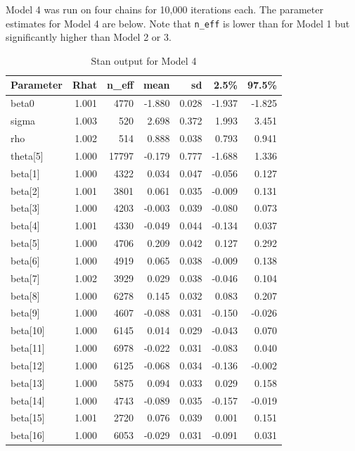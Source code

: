 \documentclass[
]{article}
\begin{document}
Model 4 was run on four chains for 10,000 iterations each. The parameter
estimates for Model 4 are below. Note that \texttt{n\_eff} is lower than
for Model 1 but significantly higher than Model 2 or 3.

\begin{table}[ht]
\centering
\begin{tabular}{lrrrrrr}
  \toprule
Parameter & Rhat & n\_eff & mean & sd & 2.5\% & 97.5\% \\ 
  \midrule
beta0 & 1.001 & 4770 & -1.880 & 0.028 & -1.937 & -1.825 \\ 
  sigma & 1.003 &  520 & 2.698 & 0.372 & 1.993 & 3.451 \\ 
  rho & 1.002 &  514 & 0.888 & 0.038 & 0.793 & 0.941 \\ 
  theta[5] & 1.000 & 17797 & -0.179 & 0.777 & -1.688 & 1.336 \\ 
  beta[1] & 1.000 & 4322 & 0.034 & 0.047 & -0.056 & 0.127 \\ 
  beta[2] & 1.001 & 3801 & 0.061 & 0.035 & -0.009 & 0.131 \\ 
  beta[3] & 1.000 & 4203 & -0.003 & 0.039 & -0.080 & 0.073 \\ 
  beta[4] & 1.001 & 4330 & -0.049 & 0.044 & -0.134 & 0.037 \\ 
  beta[5] & 1.000 & 4706 & 0.209 & 0.042 & 0.127 & 0.292 \\ 
  beta[6] & 1.000 & 4919 & 0.065 & 0.038 & -0.009 & 0.138 \\ 
  beta[7] & 1.002 & 3929 & 0.029 & 0.038 & -0.046 & 0.104 \\ 
  beta[8] & 1.000 & 6278 & 0.145 & 0.032 & 0.083 & 0.207 \\ 
  beta[9] & 1.000 & 4607 & -0.088 & 0.031 & -0.150 & -0.026 \\ 
  beta[10] & 1.000 & 6145 & 0.014 & 0.029 & -0.043 & 0.070 \\ 
  beta[11] & 1.000 & 6978 & -0.022 & 0.031 & -0.083 & 0.040 \\ 
  beta[12] & 1.000 & 6125 & -0.068 & 0.034 & -0.136 & -0.002 \\ 
  beta[13] & 1.000 & 5875 & 0.094 & 0.033 & 0.029 & 0.158 \\ 
  beta[14] & 1.000 & 4743 & -0.089 & 0.035 & -0.157 & -0.019 \\ 
  beta[15] & 1.001 & 2720 & 0.076 & 0.039 & 0.001 & 0.151 \\ 
  beta[16] & 1.000 & 6053 & -0.029 & 0.031 & -0.091 & 0.031 \\ 
   \bottomrule
\end{tabular}
\caption{Stan output for Model 4} 
\end{table}
\end{document}
